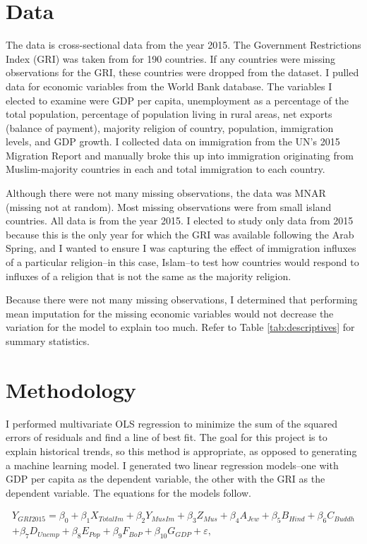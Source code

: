 \documentclass[12pt,english]{article}
\begin{document}
\section{Data}
The data is cross-sectional data from the year 2015. The Government Restrictions Index (GRI) was taken from \citet{Pew} for 190 countries. If any countries were missing observations for the GRI, these countries were dropped from the dataset. I pulled data for economic variables from the World Bank database. The variables I elected to examine were GDP per capita, unemployment as a percentage of the total population, percentage of population living in rural areas, net exports (balance of payment), majority religion of country, population, immigration levels, and GDP growth. I collected data on immigration from the UN's 2015 Migration Report and manually broke this up into immigration originating from Muslim-majority countries in each and total immigration to each country. 

Although there were not many missing observations, the data was MNAR (missing not at random). Most missing observations were from small island countries. All data is from the year 2015. I elected to study only data from 2015 because this is the only year for which the GRI was available following the Arab Spring, and I wanted to ensure I was capturing the effect of immigration influxes of a particular religion--in this case, Islam--to test how countries would respond to influxes of a religion that is not the same as the majority religion.

Because there were not many missing observations, I determined that performing mean imputation for the missing economic variables would not decrease the variation for the model to explain too much. Refer to Table \ref{tab:descriptives} for summary statistics.

\section{Methodology}
I performed multivariate OLS regression to minimize the sum of the squared errors of residuals and find a line of best fit. The goal for this project is to explain historical trends, so this method is appropriate, as opposed to generating a machine learning model. I generated two linear regression models--one with GDP per capita as the dependent variable, the other with the GRI as the dependent variable. The equations for the models follow.

\begin{multline}
\label{eq:1}
Y_{GRI2015}=\beta_{0} + \beta_{1}X_{TotalIm} + \beta_{2} Y_{MusIm} + \beta_{3} Z_{Mus} + \beta_{4}A_{Jew} + \beta_{5}B_{Hind} + \beta_{6}C_{Buddh} \\ + \beta_{7}D_{Unemp} + \beta_{8}E_{Pop} + \beta_{9}F_{BoP} + \beta_{10}G_{GDP} + \varepsilon,
\end{multline}
\end{document}
